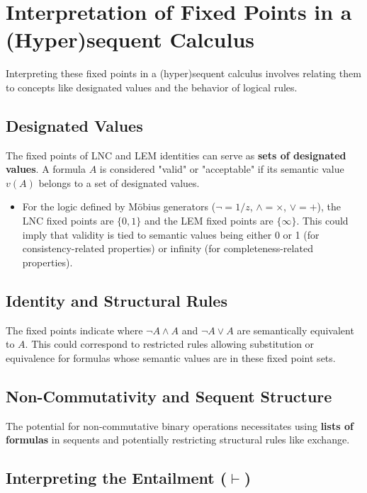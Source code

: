 	\section{Interpretation of Fixed Points in a (Hyper)sequent Calculus}
	
	Interpreting these fixed points in a (hyper)sequent calculus involves relating them to concepts like designated values and the behavior of logical rules.
	
	\subsection{Designated Values}
	
	The fixed points of LNC and LEM identities can serve as \textbf{sets of designated values}. A formula $A$ is considered "valid" or "acceptable" if its semantic value $v(A)$ belongs to a set of designated values.
	
	\begin{itemize}
		\item For the logic defined by M\"{o}bius generators ($\neg=1/z$, $\wedge=\times$, $\vee=+$), the LNC fixed points are $\{0, 1\}$ and the LEM fixed points are $\{\infty\}$. This could imply that validity is tied to semantic values being either 0 or 1 (for consistency-related properties) or infinity (for completeness-related properties).
	\end{itemize}
	
	\subsection{Identity and Structural Rules}
	
	The fixed points indicate where $\neg A \wedge A$ and $\neg A \vee A$ are semantically equivalent to $A$. This could correspond to restricted rules allowing substitution or equivalence for formulas whose semantic values are in these fixed point sets.
	
	\subsection{Non-Commutativity and Sequent Structure}
	
	The potential for non-commutative binary operations necessitates using \textbf{lists of formulas} in sequents and potentially restricting structural rules like exchange.
	
	\subsection{Interpreting the Entailment ($\vdash$)}
	
